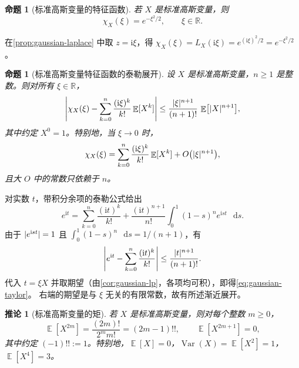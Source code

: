 \documentclass[UTF8,11pt,a4paper,oneside,fontset=fandol]{ctexrep}
\makeatletter
\numberwithin{equation}{section}
\theoremstyle{zhthm}
\newtheorem{proposition}[theorem]{命题}
\newtheorem{corollary}[theorem]{推论}
\renewenvironment{proof}[1][\proofname]{\par
  \pushQED{\qed}%
  \normalfont\topsep6\p@\@plus6\p@\relax
  \trivlist
  \item[\hskip\labelsep\bfseries#1\hspace{0.5em}]\ignorespaces
}{%
  \popQED\endtrivlist\@endpefalse
}
\renewcommand{\proofname}{证明}
\newcommand{\R}{\mathbb{R}}
\DeclareMathOperator{\E}{\mathbb{E}}
\DeclareMathOperator{\Var}{Var}
\newcommand{\iu}{\mathrm{i}}
\newcommand{\dd}{\mathop{}\!\mathrm{d}}
\DeclarePairedDelimiter{\abs}{\lvert}{\rvert}
\makeatother
\begin{document}
\begin{proposition}[标准高斯变量的特征函数]
\label{prop:gaussian-characteristic}
若 $X$ 是标准高斯变量，则
\begin{equation}
  \label{eq:gaussian-characteristic}
  \chi_X(\xi)=e^{-\xi^2/2},\qquad \xi\in\R.
\end{equation}
\end{proposition}

\begin{proof}
在\cref{prop:gaussian-laplace} 中取 $z=\iu\xi$，得
$\chi_X(\xi)=L_X(\iu\xi)=e^{(\iu\xi)^2/2}=e^{-\xi^2/2}$。
\end{proof}

\begin{proposition}[标准高斯变量特征函数的泰勒展开]
\label{prop:gaussian-taylor}
设 $X$ 是标准高斯变量，$n\ge1$ 是整数。则对所有 $\xi\in\R$，
\begin{equation}
  \label{eq:gaussian-taylor}
  \abs*{\chi_X(\xi)-\sum_{k=0}^{n}\frac{(\iu\xi)^k}{k!}\E[X^k]}
  \le\frac{\abs{\xi}^{n+1}}{(n+1)!}\,\E\bigl[\abs{X}^{n+1}\bigr],
\end{equation}
其中约定 $X^0=1$。特别地，当 $\xi\to0$ 时，
\[
  \chi_X(\xi)=\sum_{k=0}^{n}\frac{(\iu\xi)^k}{k!}\E[X^k]+O\bigl(\abs{\xi}^{n+1}\bigr),
\]
且大 $O$ 中的常数只依赖于 $n$。
\end{proposition}

\begin{proof}
对实数 $t$，带积分余项的泰勒公式给出
\[
  e^{\iu t}=\sum_{k=0}^{n}\frac{(\iu t)^k}{k!}
  +\frac{(\iu t)^{n+1}}{n!}\int_0^1(1-s)^ne^{\iu st}\,\dd s.
\]
由于 $\abs{e^{\iu st}}=1$ 且 $\int_0^1(1-s)^n\,\dd s=1/(n+1)$，有
\[
  \abs*{e^{\iu t}-\sum_{k=0}^{n}\frac{(\iu t)^k}{k!}}\le\frac{\abs{t}^{n+1}}{(n+1)!}.
\]
代入 $t=\xi X$ 并取期望（由\cref{cor:gaussian-lp}，各项均可积），即得\cref{eq:gaussian-taylor}。
右端的期望是与 $\xi$ 无关的有限常数，故有所述渐近展开。
\end{proof}

\begin{corollary}[标准高斯变量的矩]
\label{cor:gaussian-moments}
若 $X$ 是标准高斯变量，则对每个整数 $m\ge0$，
\begin{equation}
  \label{eq:gaussian-moments}
  \E[X^{2m}]=\frac{(2m)!}{2^m m!}=(2m-1)!!,
  \qquad
  \E[X^{2m+1}]=0,
\end{equation}
其中约定 $(-1)!!:=1$。特别地，$\E[X]=0$，$\Var(X)=\E[X^2]=1$，$\E[X^4]=3$。
\end{corollary}
\end{document}

